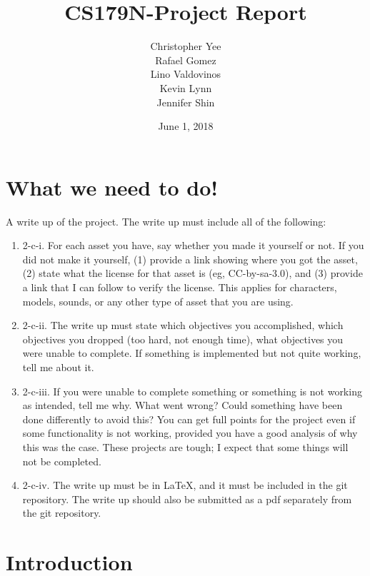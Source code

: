 \documentclass{article}
\title{CS179N-Project Report}
\author{Christopher Yee\\ Rafael Gomez \\Lino Valdovinos  \\Kevin Lynn \\Jennifer Shin }
\date{June 1, 2018}
\begin{document}
\maketitle
\section{What we need to do!}

A write up of the project.  The write up must include all of the following:
\begin{enumerate}
\item 2-c-i. For each asset you have, say whether you made it yourself or not.  If you did not make it yourself, (1) provide a link showing where you got the asset, (2) state what the license for that asset is (eg, CC-by-sa-3.0), and (3) provide a link that I can follow to verify the license.  This applies for characters, models, sounds, or any other type of asset that you are using.

\item 2-c-ii. The write up must state which objectives you accomplished, which objectives you dropped (too hard, not enough time), what objectives you were unable to complete.  If something is implemented but not quite working, tell me about it.

\item 2-c-iii. If you were unable to complete something or something is not working as intended, tell me why.  What went wrong?  Could something have been done differently to avoid this?  You can get full points for the project even if some functionality is not working, provided you have a good analysis of why this was the case.  These projects are tough; I expect that some things will not be completed.

\item 2-c-iv. The write up must be in LaTeX, and it must be included in the git repository.  The write up should also be submitted as a pdf separately from the git repository.

\end{enumerate}


\section{Introduction}
\end{document}

